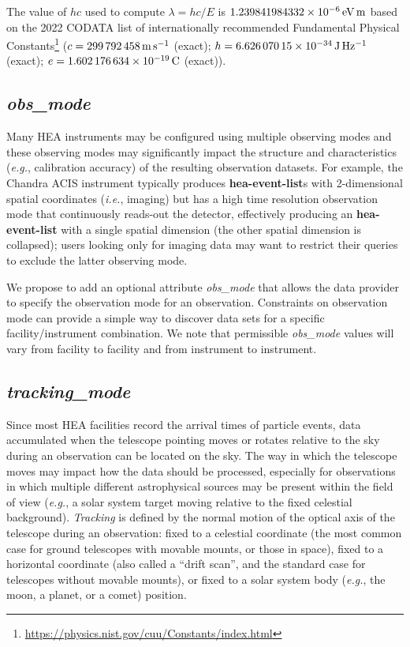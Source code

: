 \documentclass[11pt,a4paper]{ivoa}
\begin{document}
The value of $hc$ used to compute $\lambda = hc/E$ is $1.239841984332\times10^{-6}\rm \,eV\,m$ based on the 2022 CODATA list of internationally recommended Fundamental Physical Constants\footnote{\url{https://physics.nist.gov/cuu/Constants/index.html}} ($c = 299\,792\,458\rm \,m\,s^{-1}$ (exact); $h = 6.626\,070\,15\times10^{-34}\rm \,J\,Hz^{-1}$ (exact); $e = 1.602\,176\,634\times10^{-19}\rm \,C$ (exact)).

\subsection{{\em obs\_mode}}

Many \gls{HEA} instruments may be configured using multiple observing modes and these observing modes may significantly impact the structure and characteristics ({\em e.g.\/}, calibration accuracy) of the resulting observation datasets. For example, the Chandra ACIS instrument typically produces {\bf hea-event-list}s with 2-dimensional spatial coordinates ({\em i.e.\/}, imaging) but has a high time resolution observation mode that continuously reads-out the detector, effectively producing an {\bf hea-event-list} with a single spatial dimension (the other spatial dimension is collapsed); users looking only for imaging data may want to restrict their queries to exclude the latter observing mode.

We propose to add an optional attribute {\em obs\_mode\/} that allows the data provider to specify the observation mode for an observation.  Constraints on observation mode can provide a simple way to discover data sets for a specific facility/instrument combination.  We note that permissible {\em obs\_mode\/} values will vary from facility to facility and from instrument to instrument.


\subsection{{\em tracking\_mode}}

Since most \gls{HEA} facilities record the arrival times of particle events, data accumulated when the telescope pointing moves or rotates relative to the sky during an observation can be located on the sky.  The way in which the telescope moves may impact how the data should be processed, especially for observations in which multiple different astrophysical sources may be present within the field of view ({\em e.g.\/}, a solar system target moving relative to the fixed celestial background).  {\em Tracking\/} is defined by the normal motion of the optical axis of the telescope during an observation: fixed to a celestial coordinate (the most common case for ground telescopes with movable mounts, or those in space),  fixed to a horizontal coordinate (also called a ``drift scan'', and the standard case for telescopes without movable mounts),  or fixed to a solar system body ({\em e.g.\/}, the moon, a planet, or a comet) position.
\end{document}
